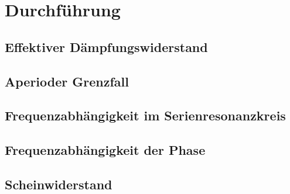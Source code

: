 \section{Durchführung}
\label{sec:Durchführung}

\subsection{Effektiver Dämpfungswiderstand}

\subsection{Aperioder Grenzfall}

\subsection{Frequenzabhängigkeit im Serienresonanzkreis}

\subsection{Frequenzabhängigkeit der Phase}

\subsection{Scheinwiderstand}
